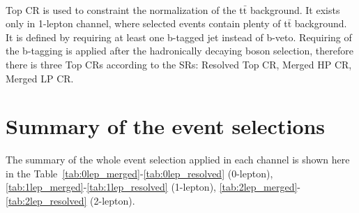 

\noindent\textbf{}  \\
Top CR is used to constraint the normalization of the t$\bar{\mathrm{t}}$ background. It exists only in 1-lepton channel, where selected events contain plenty of t$\bar{\mathrm{t}}$ background. 
It is defined by requiring at least one b-tagged jet instead of b-veto. Requiring of the b-tagging is applied after the hadronically decaying boson selection, therefore there is three Top CRs according to the SRs: Resolved Top CR, Merged HP CR, Merged LP CR.

\section{Summary of the event selections}
\label{sec:sumES}
The summary of the whole event selection applied in each channel is shown here in the Table~\ref{tab:0lep_merged}-\ref{tab:0lep_resolved} (0-lepton), \ref{tab:1lep_merged}-\ref{tab:1lep_resolved} (1-lepton), \ref{tab:2lep_merged}-\ref{tab:2lep_resolved} (2-lepton).

